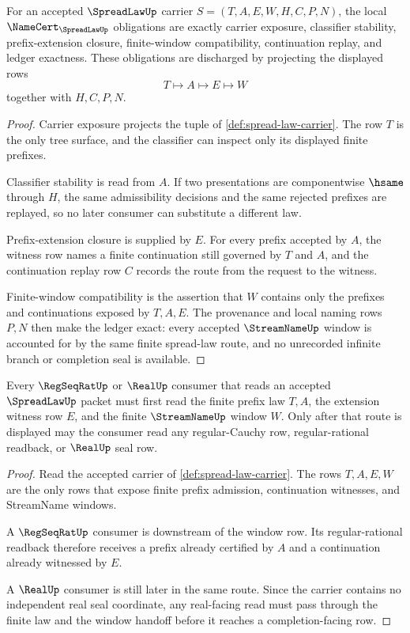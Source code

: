 \begin{theorem}
\label{thm:spread-law-namecert-obligations}
For an accepted $\SpreadLawUp$ carrier $S=(T,A,E,W,H,C,P,N)$, the local $\NameCert_{\SpreadLawUp}$ obligations are exactly carrier exposure, classifier stability, prefix-extension closure, finite-window compatibility, continuation replay, and ledger exactness. These obligations are discharged by projecting the displayed rows
$$
T\longmapsto A\longmapsto E\longmapsto W
$$
together with $H,C,P,N$.
\end{theorem}
\begin{proof}
Carrier exposure projects the tuple of \autoref{def:spread-law-carrier}. The row $T$ is the only tree surface, and the classifier can inspect only its displayed finite prefixes.

Classifier stability is read from $A$. If two presentations are componentwise $\hsame$ through $H$, the same admissibility decisions and the same rejected prefixes are replayed, so no later consumer can substitute a different law.

Prefix-extension closure is supplied by $E$. For every prefix accepted by $A$, the witness row names a finite continuation still governed by $T$ and $A$, and the continuation replay row $C$ records the route from the request to the witness.

Finite-window compatibility is the assertion that $W$ contains only the prefixes and continuations exposed by $T,A,E$. The provenance and local naming rows $P,N$ then make the ledger exact: every accepted $\StreamNameUp$ window is accounted for by the same finite spread-law route, and no unrecorded infinite branch or completion seal is available.
\end{proof}

\begin{theorem}
\label{thm:spread-law-streamname-window-handoff}
Every $\RegSeqRatUp$ or $\RealUp$ consumer that reads an accepted $\SpreadLawUp$ packet must first read the finite prefix law $T,A$, the extension witness row $E$, and the finite $\StreamNameUp$ window $W$. Only after that route is displayed may the consumer read any regular-Cauchy row, regular-rational readback, or $\RealUp$ seal row.
\end{theorem}
\begin{proof}
Read the accepted carrier of \autoref{def:spread-law-carrier}. The rows $T,A,E,W$ are the only rows that expose finite prefix admission, continuation witnesses, and StreamName windows.

A $\RegSeqRatUp$ consumer is downstream of the window row. Its regular-rational readback therefore receives a prefix already certified by $A$ and a continuation already witnessed by $E$.

A $\RealUp$ consumer is still later in the same route. Since the carrier contains no independent real seal coordinate, any real-facing read must pass through the finite law and the window handoff before it reaches a completion-facing row.
\end{proof}


